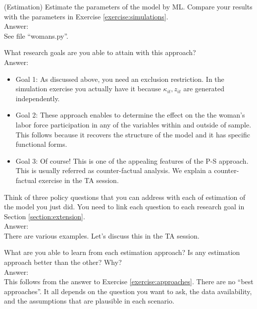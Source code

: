\begin{exercise} (Estimation)
Estimate the parameters of the model by ML. Compare your results with the parameters in Exercise \ref{exercise:simulations}.\\
\noindent Answer:\\
\noindent See file ``womans.py''.
\end{exercise}

\begin{exercise} \label{exercise:psapproach}
What research goals are you able to attain with this approach?\\
\noindent Answer:\\
\begin{itemize}
\item Goal 1: As discussed above, you need an exclusion restriction. In the simulation exercise you actually have it because $\kappa_{it},z_{it}$ are generated independently.
\item Goal 2: These approach enables to determine the effect on the the woman's labor force participation in any of the variables within and outside of sample. This follows because it recovers the structure of the model and it has specific functional forms. 
\item Goal 3: Of course! This is one of the appealing features of the P-S approach. This is usually referred as counter-factual analysis. We explain a counter-factual exercise in the TA session.  
\end{itemize}
 
\end{exercise}

\begin{exercise}
Think of three policy questions that you can address with each of estimation of the model you just did. You need to link each question to each research goal in Section \ref{section:extension}.\\
\noindent Answer:\\
\noindent There are various examples. Let's discuss this in the TA session.
\end{exercise}

\begin{exercise}
What are you able to learn from each estimation approach? Is any estimation approach better than the other? Why?\\
\noindent Answer:\\
\noindent This follows from the answer to Exercise \ref{exercise:approaches}. There are no ``best approaches''. It all depends on the question you want to ask, the data availability, and the assumptions that are plausible in each scenario.
\end{exercise}
